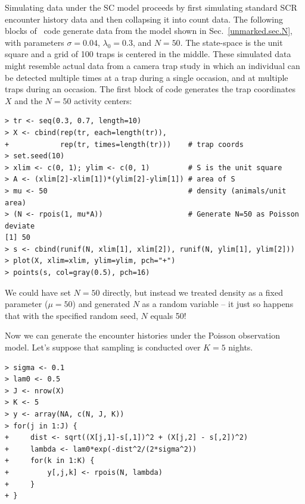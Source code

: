 Simulating data under the SC model proceeds by first simulating
standard SCR encounter history data and then collapsing it into count
data. The following blocks of \R~code generate data from
the model shown in Sec.~\ref{unmarked.sec.N}, with parameters
$\sigma=0.04$, $\lambda_0=0.3$, and $N=50$. The state-space is the unit
square and a grid of 100 traps
is centered in the middle. These simulated data might resemble actual
data from a camera trap study in which an individual can be detected multiple
times at a trap during a single occasion, and at multiple traps during
an occasion. The first block of code generates the trap coordinates
$X$ and the $N=50$ activity centers:
\begin{verbatim}
> tr <- seq(0.3, 0.7, length=10)
> X <- cbind(rep(tr, each=length(tr)),
+            rep(tr, times=length(tr)))    # trap coords
> set.seed(10)
> xlim <- c(0, 1); ylim <- c(0, 1)         # S is the unit square
> A <- (xlim[2]-xlim[1])*(ylim[2]-ylim[1]) # area of S
> mu <- 50                                 # density (animals/unit area)
> (N <- rpois(1, mu*A))                    # Generate N=50 as Poisson deviate
[1] 50
> s <- cbind(runif(N, xlim[1], xlim[2]), runif(N, ylim[1], ylim[2]))
> plot(X, xlim=xlim, ylim=ylim, pch="+")
> points(s, col=gray(0.5), pch=16)
\end{verbatim}
We could have set $N=50$ directly, but instead we treated density
as a fixed parameter ($\mu=50$) and generated $N$ as a random
variable -- it just so happens that with the specified random seed,
$N$ equals 50! %

Now we can generate the encounter histories under the
Poisson observation model. Let's suppose that sampling is conducted
over $K=5$ nights.
\begin{verbatim}
> sigma <- 0.1
> lam0 <- 0.5
> J <- nrow(X)
> K <- 5
> y <- array(NA, c(N, J, K))
> for(j in 1:J) {
+     dist <- sqrt((X[j,1]-s[,1])^2 + (X[j,2] - s[,2])^2)
+     lambda <- lam0*exp(-dist^2/(2*sigma^2))
+     for(k in 1:K) {
+         y[,j,k] <- rpois(N, lambda)
+     }
+ }
\end{verbatim}

